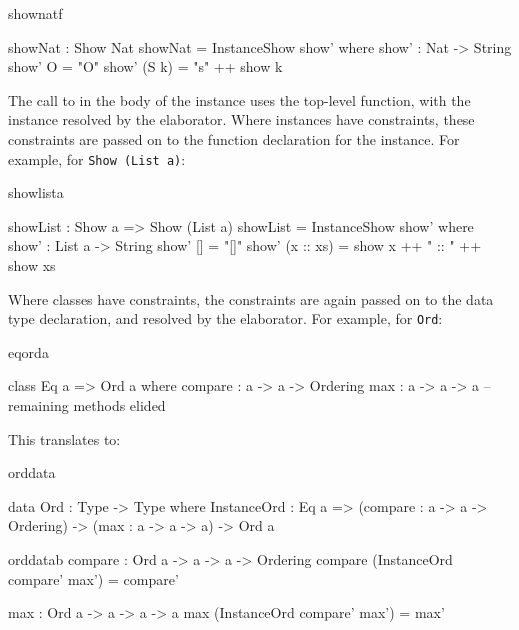 \begin{SaveVerbatim}{shownatf}

showNat : Show Nat
showNat = InstanceShow show' where
    show' : Nat -> String
    show' O = "O"
    show' (S k) = "s" ++ show k

\end{SaveVerbatim}

The call to  in the body of the instance uses the top-level 
function, with the instance resolved by the elaborator.
Where instances have constraints, these constraints are passed on to
the function declaration for the instance. For example, for \texttt{Show (List a)}:

\begin{SaveVerbatim}{showlista}

showList : Show a => Show (List a)
showList = InstanceShow show' where
    show' : List a -> String
    show' []        = "[]"
    show' (x :: xs) = show x ++ " :: " ++ show xs

\end{SaveVerbatim}

\noindent
Where classes have constraints, the
constraints are again passed on to the data type declaration, and resolved by the
elaborator. For example, for \texttt{Ord}:

\begin{SaveVerbatim}{eqorda}

class Eq a => Ord a where
    compare : a -> a -> Ordering
    max : a -> a -> a
    -- remaining methods elided

\end{SaveVerbatim}

\noindent
This translates to:

\begin{SaveVerbatim}{orddata}

data Ord : Type -> Type where
    InstanceOrd : Eq a => (compare : a -> a -> Ordering) -> 
                          (max : a -> a -> a) ->  Ord a 

\end{SaveVerbatim}

\begin{SaveVerbatim}{orddatab}
compare : Ord a -> a -> a -> Ordering
compare (InstanceOrd compare' max') = compare'

max : Ord a -> a -> a -> a
max (InstanceOrd compare' max') = max'

\end{SaveVerbatim}

